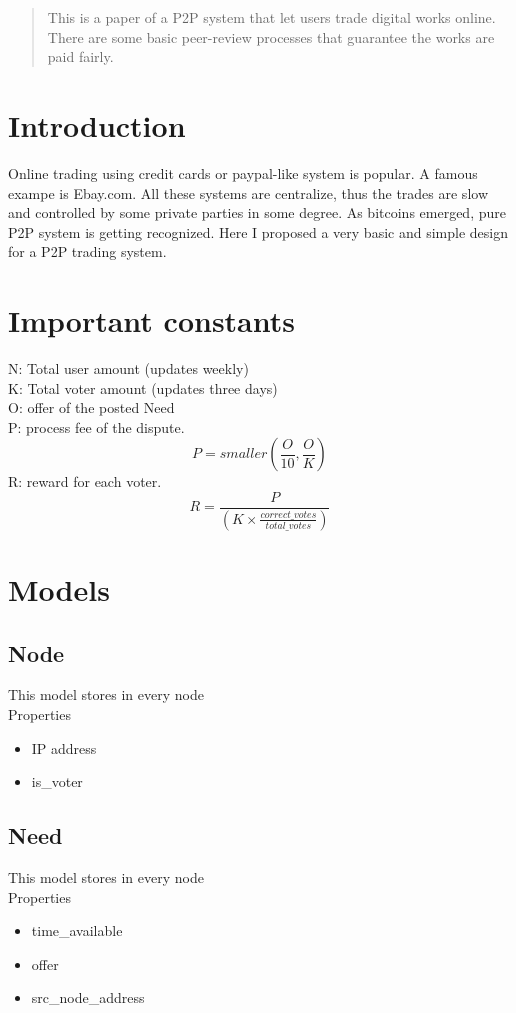 \documentclass[12pt]{article}
\begin{document}
\maketitle

\begin{abstract}
This is a paper of a P2P system that let users trade digital works online. There are some basic peer-review processes that guarantee the works are paid fairly.
\end{abstract}

\section{Introduction}
Online trading using credit cards or paypal-like system is popular. A famous exampe is Ebay.com. All these systems are centralize, thus the trades are slow and controlled by some private parties in some degree. As bitcoins emerged, pure P2P system is getting recognized. Here I proposed a very basic and simple design for a P2P trading system. 

\section{Important constants}
N: Total user amount (updates weekly)\\
K: Total voter amount (updates three days)\\
O: offer of the posted Need\\
P: process fee of the dispute. 
\[
P = smaller(\frac{O}{10}, \frac{O}{K})
\]
R: reward for each voter. 
\[
R = \frac{P}{(K \times \frac{correct\_votes}{total\_votes})}
\]

\section{Models}

\subsection{Node}
This model stores in every node\\
Properties
\begin{itemize}
	\item IP address
	\item is\_voter
\end{itemize}

\subsection{Need}
This model stores in every node\\
Properties
\begin{itemize}
	\item time\_available
	\item offer
	\item src\_node\_address
\end{itemize}
\end{document}
